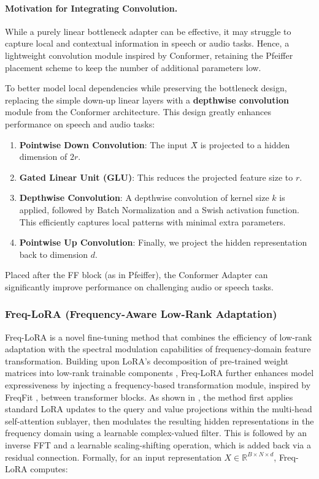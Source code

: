\documentclass[11pt]{article}
\begin{document}
\paragraph{Motivation for Integrating Convolution.}
While a purely linear bottleneck adapter can be effective, it may struggle to capture local and contextual information in speech or audio tasks. Hence, a lightweight convolution module inspired by Conformer, retaining the Pfeiffer placement scheme to keep the number of additional parameters low.

To better model local dependencies while preserving the bottleneck design, replacing the simple down-up linear layers with a \textbf{depthwise convolution} module from the Conformer architecture. This design greatly enhances performance on speech and audio tasks:

\begin{enumerate}
    \item \textbf{Pointwise Down Convolution}: The input $X̂$ is projected to a hidden dimension of $2r$. 
    \item \textbf{Gated Linear Unit (GLU)}: This reduces the projected feature size to $r$.
    \item \textbf{Depthwise Convolution}: A depthwise convolution of kernel size $k$ is applied, followed by Batch Normalization and a Swish activation function. This efficiently captures local patterns with minimal extra parameters.
    \item \textbf{Pointwise Up Convolution}: Finally, we project the hidden representation back to dimension $d$.
\end{enumerate}

Placed after the FF block (as in Pfeiffer), the Conformer Adapter can significantly improve performance on challenging audio or speech tasks.

\subsubsection{Freq-LoRA (Frequency-Aware Low-Rank Adaptation)}

Freq-LoRA is a novel fine-tuning method that combines the efficiency of low-rank adaptation with the spectral modulation capabilities of frequency-domain feature transformation. Building upon LoRA's decomposition of pre-trained weight matrices into low-rank trainable components \cite{hu2021lora}, Freq-LoRA further enhances model expressiveness by injecting a frequency-based transformation module, inspired by FreqFit \cite{ly2024enhancing}, between transformer blocks. As shown in , the method first applies standard LoRA updates to the query and value projections within the multi-head self-attention sublayer, then modulates the resulting hidden representations in the frequency domain using a learnable complex-valued filter. This is followed by an inverse FFT and a learnable scaling-shifting operation, which is added back via a residual connection. Formally, for an input representation $X \in \mathbb{R}^{B \times N \times d}$, Freq-LoRA computes:
\end{document}
